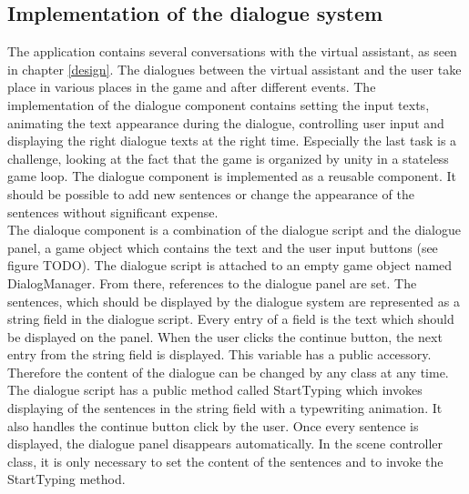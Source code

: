 \subsection{Implementation of the dialogue system}
The application contains several conversations with the virtual assistant, as seen in chapter \ref{design}. The dialogues between the virtual assistant and the user take place in various places in the game and after different events. The implementation of the dialogue component contains setting the input texts, animating the text appearance during the dialogue, controlling user input and displaying the right dialogue texts at the right time. Especially the last task is a challenge, looking at the fact that the game is organized by unity in a stateless game loop. The dialogue component is implemented as a reusable component. It should be possible to add new sentences or change the appearance of the sentences without significant expense.\\
The dialoque component is a combination of the dialogue script and the dialogue panel, a game object which contains the text and the user input buttons (see figure TODO). The dialogue script is attached to an empty game object named DialogManager. From there, references to the dialogue panel are set. The sentences, which should be displayed by the dialogue system are represented as a string field in the dialogue script. Every entry of a field is the text which should be displayed on the panel. When the user clicks the continue button, the next entry from the string field is displayed. This variable has a public accessory. Therefore the content of the dialogue can be changed by any class at any time. \\
The dialogue script has a public method called StartTyping which invokes displaying of the sentences in the string field with a typewriting animation. It also handles the continue button click by the user. Once every sentence is displayed, the dialogue panel disappears automatically. In the scene controller class, it is only necessary to set the content of the sentences and to invoke the StartTyping method. \\

